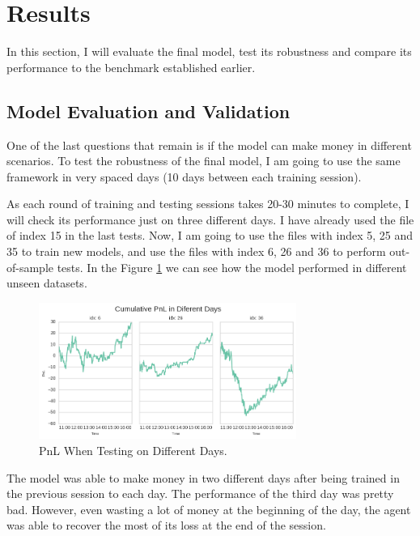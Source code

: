 \documentclass[a4paper]{article}
\begin{document}

\section{Results}
\label{sec:results}

In this section, I will evaluate the final model, test its robustness and compare its performance to the benchmark established earlier.

\subsection{Model Evaluation and Validation}
One of the last questions that remain is if the model can make money in different scenarios. To test the robustness of the final model, I am going to use the same framework in very spaced days (10 days between each training session).

As each round of training and testing sessions takes 20-30 minutes to complete, I will check its performance just on three different days. I have already used the file of index 15 in the last tests. Now, I am going to use the files with index 5, 25 and 35 to train new models, and use the files with index 6, 26 and 36 to perform out-of-sample tests. In the Figure \ref{fig:pnl_diff_days} we can see how the model performed in different unseen datasets.

\begin{figure}[ht]
\centering
\includegraphics[width=0.75\textwidth]{figures/pnl_diff_days.png}
\caption{\label{fig:pnl_diff_days}PnL When Testing on Different Days.}
\end{figure}

The model was able to make money in two different days after being trained in the previous session to each day. The performance of the third day was pretty bad. However, even wasting a lot of money at the beginning of the day, the agent was able to recover the most of its loss at the end of the session.
\end{document}
